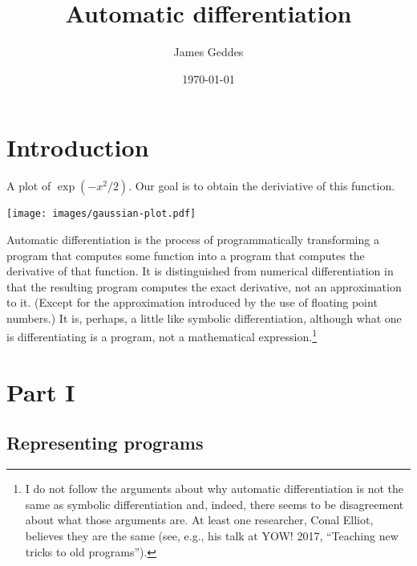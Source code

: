 \documentclass[11pt, a4paper]{article}
\title{Automatic differentiation}
\author{James Geddes}
\date{\today}
\begin{document}
\maketitle

\section{Introduction}%
\label{sec:introduction}

\begin{marginfigure}
  \caption{A plot of $\exp(-x^2/2)$. Our goal is to obtain the
    deriviative of this function.\label{fig:gaussian-plot}}
  \centering
  \texttt{[image: images/gaussian-plot.pdf]}
\end{marginfigure}
Automatic differentiation is the process of programmatically
transforming a program that computes some function into a program that
computes the derivative of that function. It is distinguished from
numerical differentiation in that the resulting program computes the
exact derivative, not an approximation to it. (Except for the
approximation introduced by the use of floating point numbers.) It is,
perhaps, a little like symbolic differentiation, although what one is
differentiating is a program, not a mathematical
expression.\footnote{I do not follow the arguments about why automatic
  differentiation is not the same as symbolic differentiation and,
  indeed, there seems to be disagreement about what those arguments
  are. At least one researcher, Conal Elliot, believes they are the
  same (see, e.g., his talk at YOW! 2017, ``Teaching new tricks to old
  programs'').}

\section{Part  I}

\subsection{Representing programs}
\end{document}
